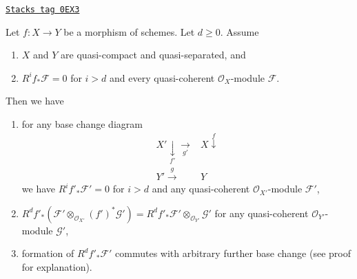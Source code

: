 \begin{lemma}
\label{limits-lemma-top-cohomology-functor}
\href{https://stacks.math.columbia.edu/tag/0EX3}{\texttt{Stacks tag 0EX3}}

Let $f : X \to Y$ be a morphism of schemes. Let $d \geq 0$. Assume
\begin{enumerate}
\item $X$ and $Y$ are quasi-compact and quasi-separated, and
\item $R^if_*\mathcal{F} = 0$ for $i > d$ and
every quasi-coherent $\mathcal{O}_X$-module $\mathcal{F}$.
\end{enumerate}
Then we have
\begin{enumerate}
\item[(a)] for any base change diagram
$$
\begin{array}{cc}X' \underset{f'}{\downarrow}\underset{g'}{\longrightarrow} & X \overset{f}{\downarrow} \\ Y' \overset{g}{\longrightarrow} & Y\end{array}
$$
we have $R^if'_*\mathcal{F}' = 0$ for $i > d$ and any quasi-coherent
$\mathcal{O}_{X'}$-module $\mathcal{F}'$,
\item[(b)]
$R^df'_*(\mathcal{F}' \otimes_{\mathcal{O}_{X'}} (f')^*\mathcal{G}') =
R^df'_*\mathcal{F}' \otimes_{\mathcal{O}_{Y'}} \mathcal{G}'$
for any quasi-coherent $\mathcal{O}_{Y'}$-module $\mathcal{G}'$,
\item[(c)] formation of $R^df'_*\mathcal{F}'$ commutes with arbitrary
further base change (see proof for explanation).
\end{enumerate}
\end{lemma}


